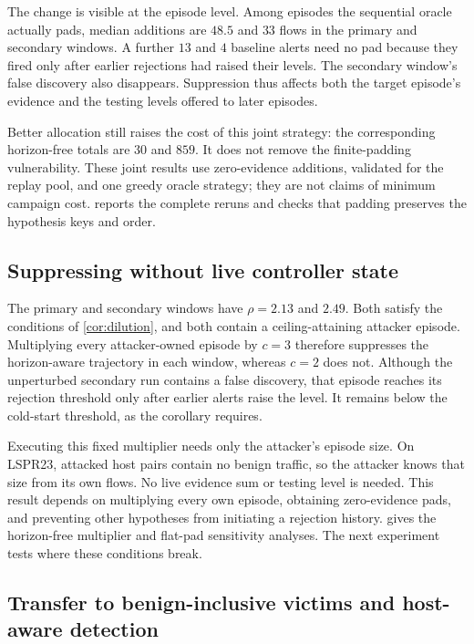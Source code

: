 \documentclass[conference]{IEEEtran}
\begin{document}
The change is visible at the episode level. Among episodes the sequential oracle actually pads,
median additions are $48.5$ and $33$ flows in the primary and secondary windows. A further $13$
and $4$ baseline alerts need no pad because they fired only after earlier rejections had raised
their levels. The secondary window's false discovery also disappears. Suppression thus affects
both the target episode's evidence and the testing levels offered to later episodes.

Better allocation still raises the cost of this joint strategy: the corresponding horizon-free
totals are $30$ and $859$. It does not remove the finite-padding vulnerability. These joint results
use zero-evidence additions, validated for the replay pool, and one greedy oracle strategy; they
are not claims of minimum campaign cost.  reports the complete reruns and checks
that padding preserves the hypothesis keys and order.

\subsection{Suppressing without live controller state}\label{sec:statefree}

The primary and secondary windows have $\rho=2.13$ and $2.49$. Both satisfy the conditions of
\cref{cor:dilution}, and both contain a ceiling-attaining attacker episode. Multiplying every
attacker-owned episode by $c=3$ therefore suppresses the horizon-aware trajectory in each window,
whereas $c=2$ does not. Although the unperturbed secondary run contains a false discovery, that
episode reaches its rejection threshold only after earlier alerts raise the level. It remains below
the cold-start threshold, as the corollary requires.

Executing this fixed multiplier needs only the attacker's episode size. On LSPR23, attacked host
pairs contain no benign traffic, so the attacker knows that size from its own flows. No live
evidence sum or testing level is needed. This result depends on multiplying every own episode,
obtaining zero-evidence pads, and preventing other hypotheses from initiating a rejection history.
 gives the horizon-free multiplier and flat-pad sensitivity analyses. The next
experiment tests where these conditions break.

\subsection{Transfer to benign-inclusive victims and host-aware detection}\label{sec:transferattack}
\end{document}
